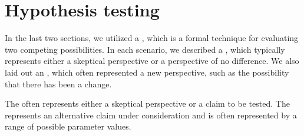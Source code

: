 



%
%
%
%





\section{Hypothesis testing}

In the last two sections, we utilized a , which is a formal technique for evaluating two competing possibilities. In each scenario, we described a , which typically represents either a skeptical perspective or a perspective of no difference. We also laid out an , which often represented a new perspective, such as the possibility that there has been a change.

\begin{termBox}{
{\small The  often represents either a skeptical perspective or a claim to be tested. The  represents an alternative claim under consideration and is often represented by a range of possible parameter values.}}
\end{termBox}

